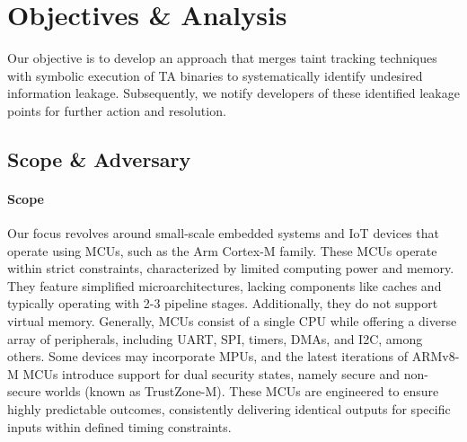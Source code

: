 \section{Objectives \& Analysis} \label{sect:design}
%

Our objective is to develop an approach that merges taint tracking techniques
with symbolic execution of \ac{TA} binaries to
systematically identify undesired information leakage. Subsequently, we
notify developers of these identified leakage points for
further action and resolution. 

\subsection{Scope \& Adversary}
%
\paragraph{\textbf{Scope}} Our focus revolves around small-scale embedded
systems and IoT devices that operate using MCUs, such as the Arm Cortex-M
family. These MCUs operate within strict constraints, characterized by
limited computing power and memory. They feature simplified
microarchitectures, lacking components like caches and typically operating
with 2-3 pipeline stages. Additionally, they do not support virtual memory.
Generally, MCUs consist of a single CPU while offering a diverse array of
peripherals, including UART, SPI, timers, DMAs, and I2C, among others. Some
devices may incorporate MPUs, and the latest iterations of ARMv8-M MCUs
introduce support for dual security states, namely secure and non-secure
worlds (known as TrustZone-M). These MCUs are engineered to ensure highly
predictable outcomes, consistently delivering identical outputs for
specific inputs within defined timing constraints.

